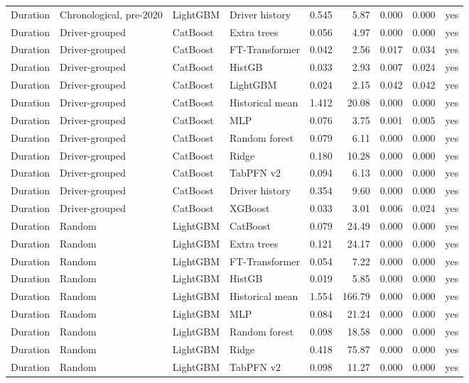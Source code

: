 {\begin{longtable}{llllrrrrl}
Duration & Chronological, pre-2020 & LightGBM & Driver history & 0.545 & 5.87 & 0.000 & 0.000 & yes \\
Duration & Driver-grouped & CatBoost & Extra trees & 0.056 & 4.97 & 0.000 & 0.000 & yes \\
Duration & Driver-grouped & CatBoost & FT-Transformer & 0.042 & 2.56 & 0.017 & 0.034 & yes \\
Duration & Driver-grouped & CatBoost & HistGB & 0.033 & 2.93 & 0.007 & 0.024 & yes \\
Duration & Driver-grouped & CatBoost & LightGBM & 0.024 & 2.15 & 0.042 & 0.042 & yes \\
Duration & Driver-grouped & CatBoost & Historical mean & 1.412 & 20.08 & 0.000 & 0.000 & yes \\
Duration & Driver-grouped & CatBoost & MLP & 0.076 & 3.75 & 0.001 & 0.005 & yes \\
Duration & Driver-grouped & CatBoost & Random forest & 0.079 & 6.11 & 0.000 & 0.000 & yes \\
Duration & Driver-grouped & CatBoost & Ridge & 0.180 & 10.28 & 0.000 & 0.000 & yes \\
Duration & Driver-grouped & CatBoost & TabPFN v2 & 0.094 & 6.13 & 0.000 & 0.000 & yes \\
Duration & Driver-grouped & CatBoost & Driver history & 0.354 & 9.60 & 0.000 & 0.000 & yes \\
Duration & Driver-grouped & CatBoost & XGBoost & 0.033 & 3.01 & 0.006 & 0.024 & yes \\
Duration & Random & LightGBM & CatBoost & 0.079 & 24.49 & 0.000 & 0.000 & yes \\
Duration & Random & LightGBM & Extra trees & 0.121 & 24.17 & 0.000 & 0.000 & yes \\
Duration & Random & LightGBM & FT-Transformer & 0.054 & 7.22 & 0.000 & 0.000 & yes \\
Duration & Random & LightGBM & HistGB & 0.019 & 5.85 & 0.000 & 0.000 & yes \\
Duration & Random & LightGBM & Historical mean & 1.554 & 166.79 & 0.000 & 0.000 & yes \\
Duration & Random & LightGBM & MLP & 0.084 & 21.24 & 0.000 & 0.000 & yes \\
Duration & Random & LightGBM & Random forest & 0.098 & 18.58 & 0.000 & 0.000 & yes \\
Duration & Random & LightGBM & Ridge & 0.418 & 75.87 & 0.000 & 0.000 & yes \\
Duration & Random & LightGBM & TabPFN v2 & 0.098 & 11.27 & 0.000 & 0.000 & yes \\

\end{longtable}}
